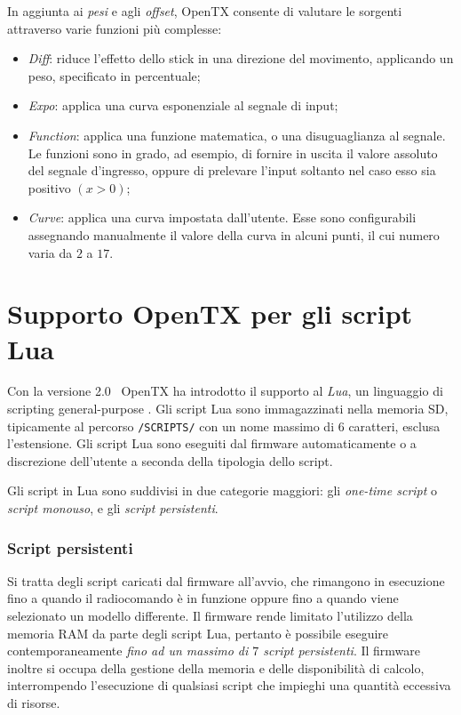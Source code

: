 \documentclass[a4paper, 12pt]{report} %
\begin{document}
In aggiunta ai \emph{pesi} e agli \emph{offset}, OpenTX consente di valutare le sorgenti attraverso varie funzioni più complesse:
\begin{itemize}
        \item \emph{Diff}: riduce l'effetto dello stick in una direzione del movimento, applicando un peso, specificato in percentuale;
        \item \emph{Expo}: applica una curva esponenziale al segnale di input;
        \item \emph{Function}: applica una funzione matematica, o una disuguaglianza al segnale. Le funzioni sono in grado, ad esempio, di fornire in uscita il valore assoluto del segnale d'ingresso, oppure di prelevare l'input soltanto nel caso esso sia positivo $(x>0)$;
        \item \emph{Curve}: applica una curva impostata dall'utente. Esse sono configurabili assegnando manualmente il valore della curva in alcuni punti, il cui numero varia da $2$ a $17$.
\end{itemize}




\section{Supporto OpenTX per gli script Lua}

Con la versione 2.0~\cite{opentx-lua-instructions} OpenTX ha introdotto il supporto al \emph{Lua}, un linguaggio di scripting general-purpose \cite{lua-website}. Gli script Lua sono immagazzinati nella memoria SD, tipicamente al percorso \texttt{/SCRIPTS/} con un nome massimo di $6$ caratteri, esclusa l'estensione. Gli script Lua sono eseguiti dal firmware automaticamente o a discrezione dell'utente a seconda della tipologia dello script.

Gli script in Lua sono suddivisi in due categorie maggiori: gli \emph{one-time script} o \emph{script monouso}, e gli \emph{script persistenti}.

\subsubsection{Script persistenti}
Si tratta degli script caricati dal firmware all'avvio, che rimangono in esecuzione fino a quando il radiocomando è in funzione oppure fino a quando viene selezionato un modello differente. Il firmware rende limitato l'utilizzo della memoria RAM da parte degli script Lua, pertanto è possibile eseguire contemporaneamente \emph{fino ad un massimo di $7$ script persistenti}. Il firmware inoltre si occupa della gestione della memoria e delle disponibilità di calcolo, interrompendo l'esecuzione di qualsiasi script che impieghi una quantità eccessiva di risorse.
\end{document}
